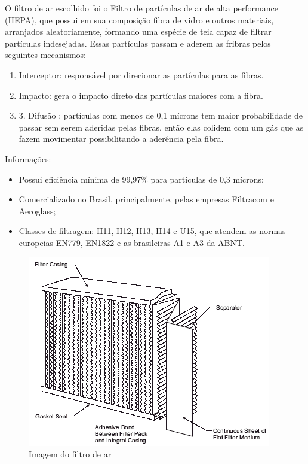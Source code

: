  O  filtro de ar escolhido foi o Filtro de partículas de ar de alta performance (HEPA), que possui em sua composição fibra de vidro  e outros materiais, arranjados aleatoriamente, formando uma espécie de teia capaz de filtrar partículas indesejadas. Essas partículas passam e aderem as fribras pelos seguintes mecanismos: \cite{edge}
    
	\begin{enumerate}
	 \item Interceptor: responsável por direcionar as partículas para as fibras.
	 \item Impacto: gera o impacto direto das partículas maiores com a fibra.
	 \item 3. Difusão : partículas com menos de 0,1 mícrons tem maior probabilidade de passar sem serem aderidas pelas fibras, então elas colidem com um gás que as fazem movimentar possibilitando a aderência pela fibra.
	\end{enumerate}
	 
Informações:\cite{filtracom}

	\begin{itemize}
	 \item Possui eficiência mínima de 99,97\% para partículas de 0,3 mícrons;
	 \item Comercializado no Brasil, principalmente, pelas empresas Filtracom e Aeroglass;
	 \item Classes de filtragem: H11, H12, H13, H14 e U15, que atendem as normas europeias EN779, EN1822 e as brasileiras A1 e A3 da ABNT.
	\end{itemize}
	
	\begin{figure}[!htbp]
	 \centering
	  \includegraphics[scale=0.5]{editaveis/figuras/filtro_ar}
	  \caption[Imagem do filtro de ar]{Imagem do filtro de ar\footnotemark}
	  \label{filtro_ar}
	\end{figure}
